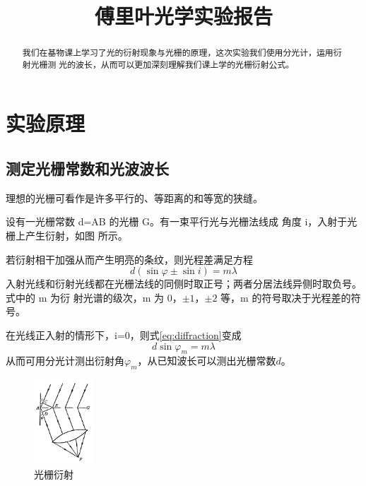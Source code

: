 \documentclass{ctexart}
\title{傅里叶光学实验报告}
\begin{document}
\maketitle

\begin{abstract}
  我们在基物课上学习了光的衍射现象与光栅的原理，这次实验我们使用分光计，运用衍射光栅测
  光的波长，从而可以更加深刻理解我们课上学的光栅衍射公式。
\end{abstract}

\section{实验原理}
  \subsection{测定光栅常数和光波波长}
    理想的光栅可看作是许多平行的、等距离的和等宽的狭缝。

    设有一光栅常数 d=AB 的光栅 G。有一束平行光与光栅法线成
    角度 i，入射于光栅上产生衍射，如图 所示。

    若衍射相干加强从而产生明亮的条纹，则光程差满足方程
    \begin{equation}\label{eq:diffraction}
      d (\sin{\varphi} \pm \sin{i}) = m\lambda 
    \end{equation}
    入射光线和衍射光线都在光栅法线的同侧时取正号；两者分居法线异侧时取负号。式中的 m 为衍
    射光谱的级次，m 为 0，$\pm1$，$\pm2$ 等，m 的符号取决于光程差的符号。

    在光线正入射的情形下，i=0，则式\eqref{eq:diffraction}变成
    \begin{equation}
      d \sin{\varphi_m} = m\lambda
    \end{equation}
    从而可用分光计测出衍射角$\varphi_m$，从已知波长可以测出光栅常数$d$。
    \begin{figure}[htbp]
      \centering
      \includegraphics[width=0.2\textwidth,height=0.25\textwidth]{图片.png}
      \caption{光栅衍射}
      \end{figure} 
\end{document}
